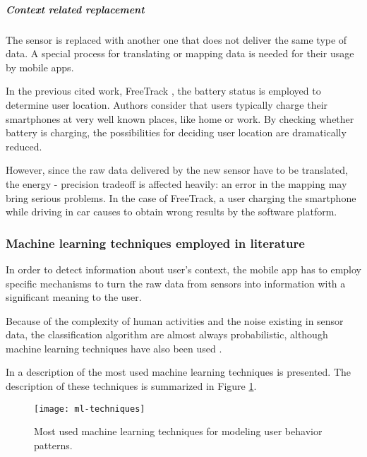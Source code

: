\subparagraph{Context related replacement}
\label{subp:context_related_replacement}

The sensor is replaced with another one that does not deliver the same type of data.
A special process for translating or mapping data is needed for their usage by mobile apps.

In the previous cited work, FreeTrack \cite{Chon2014}, the battery status is employed to determine user location.
Authors consider that users typically charge their smartphones at very well known places, like home or work.
By checking whether battery is charging, the possibilities for deciding user location are dramatically reduced.

However, since the raw data delivered by the new sensor have to be translated, the energy - precision tradeoff is affected heavily: an error in the mapping may bring serious problems.
In the case of FreeTrack, a user charging the smartphone while driving in car causes to obtain wrong results by the software platform.

\subsubsection{Machine learning techniques employed in literature}

In order to detect information about user's context, the mobile app has to employ specific mechanisms to turn the raw data from sensors into information with a significant meaning to the user.

Because of the complexity of human activities and the noise existing in sensor data, the classification algorithm are almost always probabilistic, although machine learning techniques have also been used \cite{Choudhury2008}.

In \cite{Donohoo2014} a description of the most used machine learning techniques is presented. The description of these techniques is summarized in Figure \ref{fig:ml-techniques}.

\begin{figure}
\centering
\texttt{[image: ml-techniques]}
\caption[Most used machine learning techniques]{Most used machine learning techniques for modeling user behavior patterns.}
\label{fig:ml-techniques}
\end{figure}


